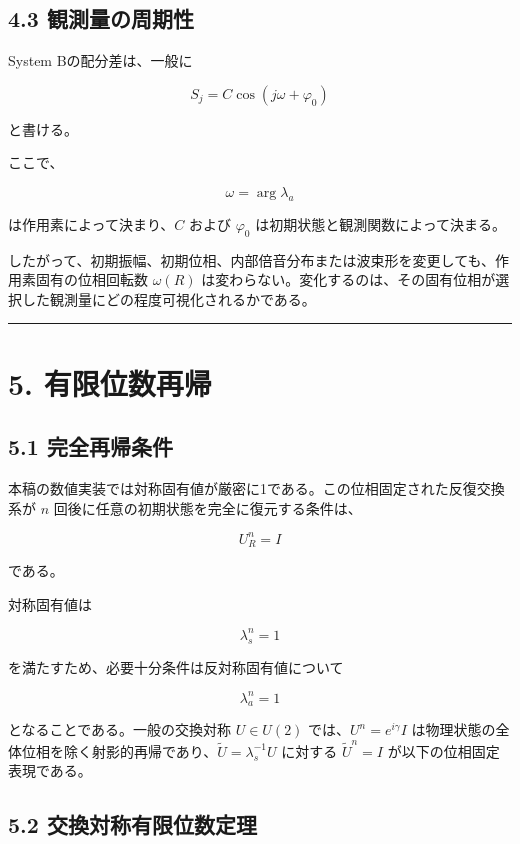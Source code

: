 \documentclass[
  a4paper,
  10pt]{article}
\begin{document}
\subsection{4.3
観測量の周期性}\label{43-ux89b3ux6e2cux91cfux306eux5468ux671fux6027}

System Bの配分差は、一般に

\[
S_j=C\cos(j\omega+\varphi_0)
\]

と書ける。

ここで、

\[
\omega=\arg\lambda_a
\]

は作用素によって決まり、\(C\) および \(\varphi_0\)
は初期状態と観測関数によって決まる。

したがって、初期振幅、初期位相、内部倍音分布または波束形を変更しても、作用素固有の位相回転数
\(\omega(R)\)
は変わらない。変化するのは、その固有位相が選択した観測量にどの程度可視化されるかである。

\begin{center}\rule{0.5\linewidth}{0.5pt}\end{center}

\section{5. 有限位数再帰}\label{5-ux6709ux9650ux4f4dux6570ux518dux5e30}

\subsection{5.1
完全再帰条件}\label{51-ux5b8cux5168ux518dux5e30ux6761ux4ef6}

本稿の数値実装では対称固有値が厳密に1である。この位相固定された反復交換系が
\(n\) 回後に任意の初期状態を完全に復元する条件は、

\[
U_R^n=I
\]

である。

対称固有値は

\[
\lambda_s^n=1
\]

を満たすため、必要十分条件は反対称固有値について

\[
\lambda_a^n=1
\]

となることである。一般の交換対称 \(U\in U(2)\)
では、\(U^n=e^{i\gamma}I\)
は物理状態の全体位相を除く射影的再帰であり、\(\widetilde U=\lambda_s^{-1}U\)
に対する \(\widetilde U^n=I\) が以下の位相固定表現である。

\subsection{5.2
交換対称有限位数定理}\label{52-ux4ea4ux63dbux5bfeux79f0ux6709ux9650ux4f4dux6570ux5b9aux7406}
\end{document}

